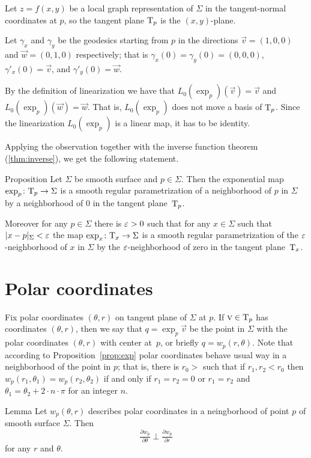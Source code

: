 Let $z=f(x,y)$ be a local graph representation of $\Sigma$ in the tangent-normal coordinates at $p$,
so the tangent plane $\mathrm{T}_p$ is the $(x,y)$-plane. 

Let $\gamma_x$ and $\gamma_y$ be the geodesics starting from $p$ in the directions
$\vec v=(1,0,0)$
and
$\vec w=(0,1,0)$
respectively;
that is $\gamma_x(0)=\gamma_y(0)=(0,0,0)$, $\gamma'_x(0)=\vec v$, and $\gamma'_y(0)=\vec w$.

By the definition of linearization we have that $L_0(\exp_p)(\vec v)=\vec v$
and $L_0(\exp_p)(\vec w)=\vec w$.
That is, $L_0(\exp_p)$ does not move a basis of $\mathrm{T}_p$.
Since the linearization $L_0(\exp_p)$ is a linear map,
it has to be identity.
\qeds 

Applying the observation together with the inverse function theorem (\ref{thm:inverse}), we get the following statement. %

\begin{thm}{Proposition}\label{prop:exp}
Let $\Sigma$ be smooth surface and $p\in \Sigma$.
Then the exponential map $\exp_p\colon\mathrm{T}_p\to \Sigma$ is a smooth regular parametrization of a neighborhood of $p$ in $\Sigma$ by a neighborhood of $0$ in the tangent plane~$\mathrm{T}_p$.

Moreover for any $p\in \Sigma$ there is $\varepsilon>0$ such that for any $x\in \Sigma$ such that $|x-p|_\Sigma<\varepsilon$ the map 
$\exp_x\colon\mathrm{T}_x\to \Sigma$ is a smooth regular parametrization of the $\varepsilon$-neighborhood of $x$ in $\Sigma$ by the $\varepsilon$-neighborhood of zero in the tangent plane~$\mathrm{T}_x$. %
\end{thm}

\section*{Polar coordinates}

Fix polar coordinates $(\theta,r)$ on tangent plane of $\Sigma$ at $p$.
If $\textsc v\in \mathrm{T}_p$ has coordinates $(\theta,r)$,
then we say that $q=\exp_p\vec v$ be the point in $\Sigma$ with the polar coordinates $(\theta,r)$ with center at~$p$, or briefly $q=w_p(r,\theta)$.
Note that according to Proposition~\ref{prop:exp} polar coordinates behave usual way in a neighborhood of the point in $p$;
that is, there is $r_0>$ such that if $r_1,r_2<r_0$ then $w_p(r_1,\theta_1) = w_p(r_2,\theta_2)$ if and only if
$r_1=r_2=0$ or $r_1=r_2$ and $\theta_1=\theta_2+2\cdot n\cdot\pi$ for an integer $n$.

\begin{thm}{Lemma}\label{lem:palar-perp}
Let $w_p(\theta,r)$ describes polar coordinates in a neingborhood of point $p$ of smooth surface $\Sigma$.
Then
\[\tfrac{\partial w_p}{\partial\theta}\perp\tfrac{\partial w_p}{\partial r}\]
for any $r$ and $\theta$.
\end{thm}

